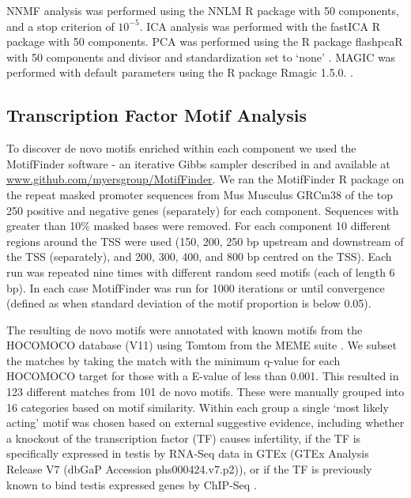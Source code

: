 NNMF analysis was performed using the NNLM R package \parencite{Lin2019NNLM} with 50 components, and a stop criterion of $10^{-5}$. ICA analysis was performed with the fastICA R package \parencite{Marchini2017fastICA} with 50 components. PCA was performed using the R package flashpcaR with 50 components and divisor and standardization set to ‘none’ \parencite{Abraham2014Fast}. MAGIC was performed with default parameters using the R package Rmagic 1.5.0. \parencite{vanDijk2018Recovering}.


\subsection{Transcription Factor Motif Analysis}
\label{sec:motifs_methods}
To discover de novo motifs enriched within each component we used the MotifFinder software - an iterative Gibbs sampler described in \cite{Altemose2017map, Davies2016Reengineering} and available at \url{www.github.com/myersgroup/MotifFinder}. We ran the MotifFinder R package on the repeat masked promoter sequences from Mus Musculus GRCm38 of the top 250 positive and negative genes (separately) for each component. Sequences with greater than 10\% masked bases were removed. For each component 10 different regions around the TSS were used (150, 200, 250 bp upstream and downstream of the TSS (separately), and 200, 300, 400, and 800 bp centred on the TSS). Each run was repeated nine times with different random seed motifs (each of length 6 bp). In each case MotifFinder was run for 1000 iterations or until convergence (defined as when standard deviation of the motif proportion is below 0.05).

The resulting de novo motifs were annotated with known motifs from the HOCOMOCO database (V11) using Tomtom from the MEME suite \parencite{Bailey2015MEME, Gupta2007Quantifying, Kulakovskiy2018HOCOMOCO}. We subset the matches by taking the match with the minimum q-value for each HOCOMOCO target for those with a E-value of less than 0.001. This resulted in 123 different matches from 101 de novo motifs. These were manually grouped into 16 categories based on motif similarity. Within each group a single ‘most likely acting’ motif was chosen based on external suggestive evidence, including whether a knockout of the transcription factor (TF) causes infertility, if the TF is specifically expressed in testis by RNA-Seq data in GTEx (GTEx Analysis Release V7 (dbGaP Accession phs000424.v7.p2)), or if the TF is previously known to bind testis expressed genes by ChIP-Seq \parencite{GTExConsortium2013GenotypeTissue}.

